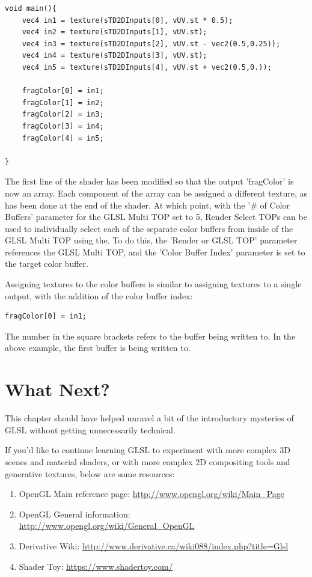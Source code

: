 \begin{fullwidth}
\begin{lstlisting}
void main(){
	vec4 in1 = texture(sTD2DInputs[0], vUV.st * 0.5);
	vec4 in2 = texture(sTD2DInputs[1], vUV.st);
	vec4 in3 = texture(sTD2DInputs[2], vUV.st - vec2(0.5,0.25));
	vec4 in4 = texture(sTD2DInputs[3], vUV.st);
	vec4 in5 = texture(sTD2DInputs[4], vUV.st + vec2(0.5,0.));

	fragColor[0] = in1;
	fragColor[1] = in2;
	fragColor[2] = in3;
	fragColor[3] = in4;
	fragColor[4] = in5;

}
\end{lstlisting}

The first line of the shader has been modified so that the output 'fragColor' is now an array. Each component of the array can be assigned a different texture, as has been done at the end of the shader. At which point, with the '\# of Color Buffers' parameter for the GLSL Multi TOP set to 5, Render Select TOPs can be used to individually select each of the separate color buffers from inside of the GLSL Multi TOP using the. To do this, the 'Render or GLSL TOP' parameter references the GLSL Multi TOP, and the 'Color Buffer Index' parameter is set to the target color buffer.

Assigning textures to the color buffers is similar to assigning textures to a single output, with the addition of the color buffer index:

\begin{lstlisting}
fragColor[0] = in1;
\end{lstlisting}

The number in the square brackets refers to the buffer being written to. In the above example, the first buffer is being written to.

\end{fullwidth}


\section{What Next?}
\begin{fullwidth}
This chapter should have helped unravel a bit of the introductory mysteries of GLSL without getting unnecessarily technical. 

If you'd like to continue learning GLSL to experiment with more complex 3D scenes and material shaders, or with more complex 2D compositing tools and generative textures, below are some resources:

\begin{enumerate}
\item OpenGL Main reference page: \url{http://www.opengl.org/wiki/Main_Page}
\item OpenGL General information: \url{http://www.opengl.org/wiki/General_OpenGL}
\item Derivative Wiki: \url{http://www.derivative.ca/wiki088/index.php?title=Glsl}
\item Shader Toy: \url{https://www.shadertoy.com/}
\end{enumerate}
\end{fullwidth}